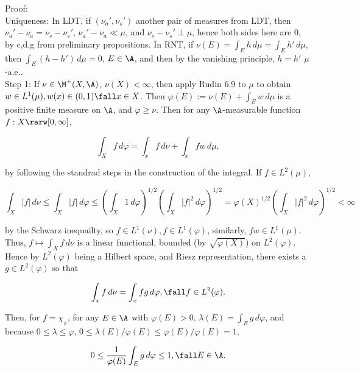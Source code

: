 



\vspace{10pt}


\noindent
Proof: \\

\noindent
Uniqueness: In LDT, if $(\nu_a', \nu_s')$ another pair of measures from LDT, then $\nu_a' - \nu_a = \nu_s - \nu_s'$, $\nu_a' - \nu_a \ll \mu$, and $\nu_s - \nu_s' \perp \mu$, hence both sides here are 0, by c,d,g from preliminary propositions. In RNT, if $ \nu(E) = \int_E h \, d\mu =  \int_E h' \, d\mu $, then $  \int_E (h - h') \, d\mu = 0$, $E \in \A$, and then by the vanishing principle, $h = h'$ $\mu$-a.e.. \\

\noindent
Step 1: If $\nu \in \M^+(X, \A)$,  $\nu(X) < \infty$, then apply Rudin 6.9 to $\mu$ to obtain $w \in L^1(\mu), w(x) \in (0,1) \fall x \in X$. Then $\varphi(E) := \nu(E) + \int_E w \, d\mu$ is a positive finite measure on $\A$, and $\varphi \ge \nu$. Then for any $\A$-measurable function $f:X \rarw [0, \infty]$,

$$
\int_X f \, d\varphi = \int_x f \, d\nu + \int_x f w \, d\mu,
$$

\noindent
by following the standrad steps in the construction of the integral. If $f \in L^2(\mu)$,


$$
\int_X |f| \, d\nu  \le  \int_X |f| \, d\varphi \le \left( \int_X 1 \, d\varphi \right)^{1/2} \left( \int_X |f|^2 \, d\varphi \right)^{1/2}   = \varphi(X)^{1/2} \left( \int_X |f|^2 \, d\varphi \right)^{1/2} < \infty
$$

\noindent
by the Schwarz inequailty, so $f \in L^1(\nu), f \in L^1(\varphi)$, similarly, $fw \in L^1(\mu)$. Thus, $f \mapsto \int_X f \, d\nu$ is a linear functional, bounded (by $\sqrt{\varphi(X)}$)  on $L^2(\varphi)$. Hence by $L^2(\varphi)$ being a Hilbert space, and Riesz representation, there exists a $g \in L^2(\varphi)$ so that

$$
\int_x f \, d\nu = \int_x fg \, d\varphi, \fall f \in L^2(\varphi).
$$


\noindent
Then, for $f = \chi_{_E}$, for any $E \in \A$ with $\varphi(E) > 0$, $\lambda(E) = \int_E g \, d\varphi$, and because $ 0 \le \lambda \le \varphi$, $ 0 \le \lambda(E) / \varphi(E) \le \varphi(E)  / \varphi(E) = 1$,

$$
0 \le \frac{1}{\varphi(E)} \int_E g \, d\varphi \le 1, \fall E \in \A.
$$

